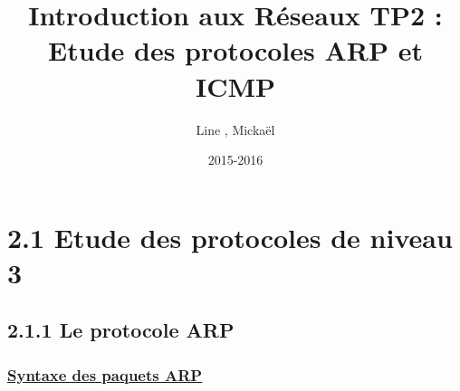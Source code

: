 \documentclass{article}
\title{Introduction aux Réseaux TP2 : \\ Etude des protocoles ARP et ICMP}
\author{Line \bsc{POUVARET}, Mickaël \bsc{TURNEL}}
\date{2015-2016}
\begin{document}
\maketitle

\section*{2.1 Etude des protocoles de niveau 3}

\subsection*{2.1.1 Le protocole ARP}

\subsubsection*{\underline{Syntaxe des paquets ARP}}
\end{document}
